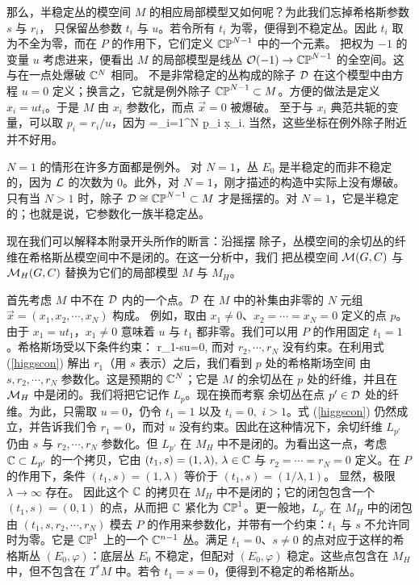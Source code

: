 那么，半稳定丛的模空间 $M$ 的相应局部模型又如何呢？为此我们忘掉希格斯参数 $s$ 与 $r_i$，
只保留丛参数 $t_i$ 与 $u$。若令所有 $t_i$ 为零，便得到不稳定丛。因此 $t_i$ 取为不全为零，而在 $P$ 的作用下，它们定义 ${\mathbb{CP}}^{N-1}$ 中的一个元素。
把权为 $-1$ 的变量 $u$ 考虑进来，便看出
$M$ 的局部模型是线丛 ${\mathcal O}(-1)\to {\mathbb{CP}}^{N-1}$ 的全空间。这与在一点处爆破 ${\mathbb C}^N$ 相同。
不是非常稳定的丛构成的除子 ${\mathcal D}$ 在这个模型中由方程 $u=0$ 定义；换言之，它就是例外除子
${\mathbb{CP}}^{N-1}\subset M$。方便的做法是定义 $x_i= u t_i$。于是 $M$ 由 $x_i$ 参数化，而点 $\vec x=0$ 被爆破。
至于与 $x_i$ 典范共轭的变量，可以取 $p_i=r_i/u$，因为
\be\label{wobo}\Omega =\sum_{i=1}^N \d p_i \d x_i. \ee
当然，这些坐标在例外除子附近并不好用。

$N=1$ 的情形在许多方面都是例外。
对 $N=1$，丛 $E_0$ 是半稳定的而非不稳定的，因为 ${\mathcal L}$ 的次数为 0。此外，对 $N=1$，刚才描述的构造中实际上没有爆破。只有当 $N>1$ 时，除子
${\mathcal D}\cong {\mathbb{CP}}^{N-1}\subset M$ 才是摇摆的。对 $N=1$，它是半稳定的；也就是说，它参数化一族半稳定丛。

现在我们可以解释本附录开头所作的断言：沿摇摆
除子，丛模空间的余切丛的纤维在希格斯丛模空间中不是闭的。在这一分析中，我们
把丛模空间 ${\mathcal M}(G,C)$ 与 ${\mathcal M}_H(G,C)$ 替换为它们的局部模型 $M$ 与 $M_H$。

首先考虑 $M$ 中不在 ${\mathcal D}$ 内的一个点。${\mathcal D}$ 在 $M$ 中的补集由非零的 $N$ 元组 $\vec x=(x_1,x_2,\cdots, x_N)$ 构成。
例如，取由 $x_1\not=0$、$x_2=\cdots= x_N=0$ 定义的点 $p$。由于 $x_1=ut_1$，$x_1\not=0$
意味着 $u$ 与 $t_1$ 都非零。我们可以用 $P$ 的作用固定
$t_1=1$。希格斯场受以下条件约束：
\be\label{higgscon} r_1-su=0, \ee
而对 $r_2,\cdots, r_N$ 没有约束。在利用式 (\ref{higgscon}) 解出 $r_1$（用 $s$ 表示）之后，我们看到 $p$ 处的希格斯场空间
由 $s,r_2, \cdots, r_N$ 参数化。这是预期的 ${\mathbb C}^N$；它是 $M$ 的余切丛在 $p$ 处的纤维，并且在 ${\mathcal M}_H$ 中是闭的。我们将把它记作 $L_p$。现在换而考察
余切丛在点 $p'\in {\mathcal D}$ 处的纤维。为此，只需取 $u=0$，仍令 $t_1=1$ 以及 $t_i=0,$ $i>1$。式 (\ref{higgscon})
仍然成立，并告诉我们令 $r_1=0$，而对 $u$ 没有约束。因此在这种情况下，余切纤维 $L_{p'}$ 仍由
$s$ 与 $r_2,\cdots, r_N$ 参数化。但 $L_{p'}$ 在 $M_H$ 中不是闭的。为看出这一点，考虑 ${\mathbb C}\subset L_{p'} $ 的一个拷贝，它由 $(t_1,s)=(1,\lambda),\,\lambda\in{\mathbb C}$
与 $r_2=\cdots = r_N=0$ 定义。在 $P$ 的作用下，条件 $(t_1,s)=(1,\lambda)$ 等价于 $(t_1,s)=(1/\lambda,1)$。
显然，极限 $\lambda\to\infty$ 存在。
因此这个 ${\mathbb C}$ 的拷贝在 $M_H$ 中不是闭的；它的闭包包含一个 $(t_1,s)=(0,1)$ 的点，从而把 ${\mathbb C}$ 紧化为 ${\mathbb{CP}}^1$。更一般地，$L_{p'}$ 在 $M_H$ 中的闭包
由 $(t_1,s,r_2,\cdots, r_N)$ 模去 $P$ 的作用来参数化，并带有一个约束：$t_1$ 与 $s$ 不允许同时为零。它是 ${\mathbb{CP}}^1$ 上的一个 ${\mathbb C}^{n-1}$ 丛。满足
$t_1=0$、$s\not=0$ 的点对应于这样的希格斯丛 $(E_0,\varphi)$：底层丛 $E_0$ 不稳定，但配对 $(E_0,\varphi)$
稳定。这些点包含在 $M_H$ 中，但不包含在 $T^*M$ 中。若令 $t_1=s=0$，便得到不稳定的希格斯丛。

